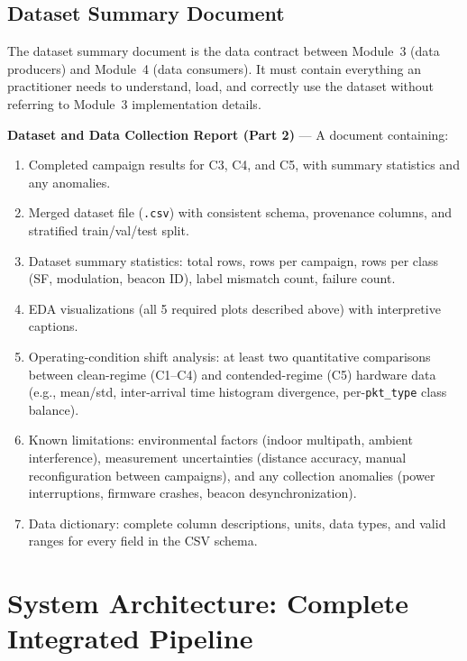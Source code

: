 \documentclass[11pt,letterpaper]{article}
\begin{document}
	\subsection{Dataset Summary Document}

	The dataset summary document is the data contract between Module~3 (data producers) and Module~4 (data consumers). It must contain everything an \ML{} practitioner needs to understand, load, and correctly use the dataset without referring to Module~3 implementation details.

	\begin{tcolorbox}[deliverable={Session 12 Deliverable}]
		\textbf{Dataset and Data Collection Report (Part 2)} --- A document containing:
		\begin{enumerate}
			\item Completed campaign results for C3, C4, and C5, with summary statistics and any anomalies.
			\item Merged dataset file (\texttt{.csv}) with consistent schema, provenance columns, and stratified train/val/test split.
			\item Dataset summary statistics: total rows, rows per campaign, rows per class (SF, modulation, beacon ID), label mismatch count, \CRC{} failure count.
			\item EDA visualizations (all 5 required plots described above) with interpretive captions.
			\item Operating-condition shift analysis: at least two quantitative comparisons between clean-regime (C1--C4) and contended-regime (C5) hardware data (e.g., \RSSI{} mean/std, inter-arrival time histogram divergence, per-\texttt{pkt\_type} class balance).
			\item Known limitations: environmental factors (indoor multipath, ambient interference), measurement uncertainties (distance accuracy, manual reconfiguration between campaigns), and any collection anomalies (power interruptions, firmware crashes, beacon desynchronization).
			\item Data dictionary: complete column descriptions, units, data types, and valid ranges for every field in the CSV schema.
		\end{enumerate}
	\end{tcolorbox}

	\newpage
	\section{System Architecture: Complete Integrated Pipeline}
\end{document}
